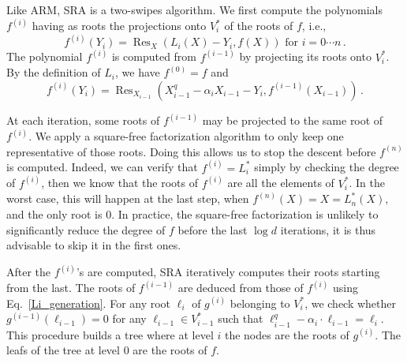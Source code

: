 \documentclass{sig-alternate}
\newcommand{\dd}{d}
\newcommand{\qq}{q}
\DeclareMathOperator{\Res}{Res}
\newcounter{algo}
\begin{document}
Like ARM, SRA is a two-swipes algorithm.  We first compute the
polynomials $f^{(i)}$ having as roots the projections onto $V_i^\ast$
of the roots of $f$, i.e.,
$$f^{(i)}(Y_i)=\Res_{X}(L_i(X)-Y_i,f(X))  \mbox{ for }i=0 \cdots n \,.$$
The polynomial $f^{(i)}$ is computed from $f^{(i-1)}$ by projecting
its roots onto $V_i^\ast$. By the definition of $L_i$, we have  $f ^{(0)}=f$ and
$$f^{(i)}(Y_i)=\Res_{X_{i-1}}(X^q_{i-1} - \alpha_i X_{i-1} -Y_i,f^{(i-1)}(X_{i-1})) \,.$$

At each iteration, some roots of $f^{(i-1)}$ may be projected to the
same root of $f^{(i)}$. We apply a square-free factorization algorithm
to only keep one representative of those roots. Doing this allows us
to stop the descent before $f^{(n)}$ is computed. Indeed, we can
verify that $f^{(i)}=L_i^\ast$ simply by checking the degree of
$f^{(i)}$, then we know that the roots of $f^{(i)}$ are all the
elements of $V_i^\ast$. In the worst case, this will happen at the
last step, when $f^{(n)}(X)=X=L_n^\ast(X)$, and the only root is $0$.
In practice, the square-free factorization is unlikely to
significantly reduce the degree of $f$ before the last $\log\dd$
iterations, it is thus advisable to skip it in the first ones.

After the $f^{(i)}$'s are computed, SRA iteratively computes their
roots starting from the last. The roots of $f^{(i-1)}$ are deduced
from those of $f^{(i)}$ using Eq.~\eqref{Li_generation}. For any root
$\ell_i$ of $g^{(i)}$ belonging to $V_i^\ast$, we check whether
$g^{(i-1)}(\ell_{i-1})=0$ for any $\ell_{i-1} \in V_{i-1}^\ast$ such that
$\ell_{i-1}^\qq-\alpha_i \cdot \ell_{i-1}=\ell_i$. This procedure builds
a tree where at level $i$ the nodes are the roots of $g^{(i)}$.  The
leafs of the tree at level $0$ are the roots of $f$.
\end{document}
